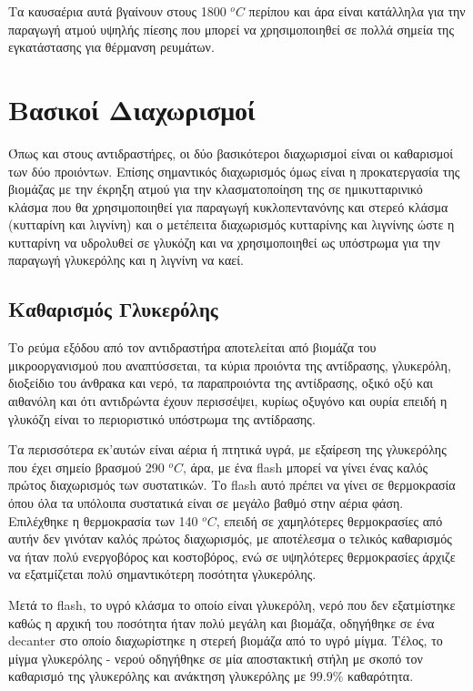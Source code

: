 \documentclass[11pt]{article}
\begin{document}
Τα καυσαέρια αυτά βγαίνουν στους 1800 \(^oC\) περίπου και άρα είναι κατάλληλα για την παραγωγή ατμού υψηλής πίεσης που μπορεί να χρησιμοποιηθεί σε πολλά σημεία της εγκατάστασης για θέρμανση ρευμάτων.

\section{Βασικοί Διαχωρισμοί}
\label{sec:org79cc4b7}
Όπως και στους αντιδραστήρες, οι δύο βασικότεροι διαχωρισμοί είναι οι καθαρισμοί των δύο προιόντων. Επίσης σημαντικός διαχωρισμός όμως είναι η προκατεργασία της βιομάζας με την έκρηξη ατμού για την κλασματοποίηση της σε ημικυτταρινικό κλάσμα που θα χρησιμοποιηθεί για παραγωγή κυκλοπεντανόνης και στερεό κλάσμα (κυτταρίνη και λιγνίνη) και ο μετέπειτα διαχωρισμός κυτταρίνης και λιγνίνης ώστε η κυτταρίνη να υδρολυθεί σε γλυκόζη και να χρησιμοποιηθεί ως υπόστρωμα για την παραγωγή γλυκερόλης και η λιγνίνη να καεί.

\subsection{Καθαρισμός Γλυκερόλης}
\label{sec:orgadba994}
Το ρεύμα εξόδου από τον αντιδραστήρα αποτελείται από βιομάζα του μικροοργανισμού που αναπτύσσεται, τα κύρια προιόντα της αντίδρασης, γλυκερόλη, διοξείδιο του άνθρακα και νερό, τα παραπροιόντα της αντίδρασης, οξικό οξύ και αιθανόλη και ότι αντιδρώντα έχουν περισσέψει, κυρίως οξυγόνο και ουρία επειδή η γλυκόζη είναι το περιοριστικό υπόστρωμα της αντίδρασης.

Τα περισσότερα εκ'αυτών είναι αέρια ή πτητικά υγρά, με εξαίρεση της γλυκερόλης που έχει σημείο βρασμού 290 \(^oC\), άρα, με ένα flash μπορεί να γίνει ένας καλός πρώτος διαχωρισμός των συστατικών. Το flash αυτό πρέπει να γίνει σε θερμοκρασία όπου όλα τα υπόλοιπα συστατικά είναι σε μεγάλο βαθμό στην αέρια φάση. Επιλέχθηκε η θερμοκρασία των 140 \(^oC\), επειδή σε χαμηλότερες θερμοκρασίες από αυτήν δεν γινόταν καλός πρώτος διαχωρισμός, με αποτέλεσμα ο τελικός καθαρισμός να ήταν πολύ ενεργοβόρος και κοστοβόρος, ενώ σε υψηλότερες θερμοκρασίες άρχιζε να εξατμίζεται πολύ σημαντικότερη ποσότητα γλυκερόλης.

Μετά το flash, το υγρό κλάσμα το οποίο είναι γλυκερόλη, νερό που δεν εξατμίστηκε καθώς η αρχική του ποσότητα ήταν πολύ μεγάλη και βιομάζα, οδηγήθηκε σε ένα decanter στο οποίο διαχωρίστηκε η στερεή βιομάζα από το υγρό μίγμα. Τέλος, το μίγμα γλυκερόλης - νερού οδηγήθηκε σε μία αποστακτική στήλη με σκοπό τον καθαρισμό της γλυκερόλης και ανάκτηση γλυκερόλης με \(99.9 \%\) καθαρότητα.
\end{document}

